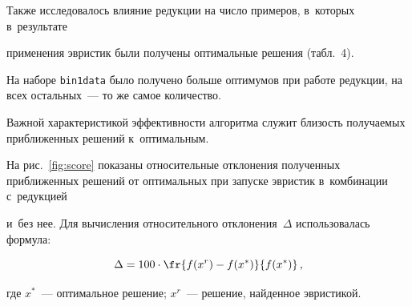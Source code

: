 Также исследовалось влияние редукции на чис\-ло примеров, в~которых в~результате 

применения эвристик были получены оптимальные решения (табл.~4). 

На наборе \texttt{bin1data} было получено больше оптимумов при работе редукции, на всех остальных~--- то же самое ко\-ли\-че\-ство.



Важной характеристикой эффективности алгоритма служит бли\-зость по\-лу\-ча\-емых при\-бли\-жен\-ных решений к~оптимальным. 

На рис.~\ref{fig:score} показаны относительные отклонения полученных при\-бли\-жен\-ных решений от оптимальных при за\-пус\-ке эвристик в~комбинации с~редукцией 

и~без нее. Для вы\-чис\-ле\-ния относительного отклонения~$\Delta$ использовалась фор\-мула:

\begin{equation*}

\label{eq:delta}

    \Delta = 100\cdot \fr{f(x^r) - f(x^*)}{f(x^*)} \,,

\end{equation*}

где $x^*$~--- оптимальное решение; $x^r$~--- решение, найденное эвристикой.





\pagebreak





\



\vspace*{-12pt}



